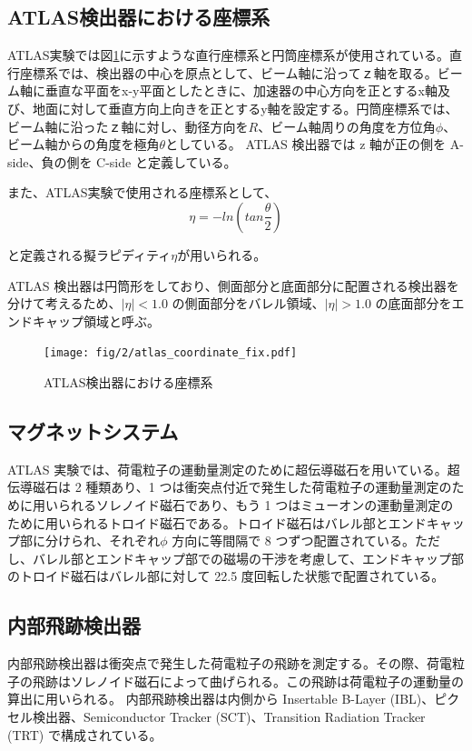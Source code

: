 \subsection{ATLAS検出器における座標系}
ATLAS実験では図\ref{fig:a}に示すような直行座標系と円筒座標系が使用されている。直行座標系では、検出器の中心を原点として、ビーム軸に沿ってｚ軸を取る。ビーム軸に垂直な平面をx-y平面としたときに、加速器の中心方向を正とするx軸及び、地面に対して垂直方向上向きを正とするy軸を設定する。円筒座標系では、ビーム軸に沿ったｚ軸に対し、動径方向を$R$、ビーム軸周りの角度を方位角$\phi$、ビーム軸からの角度を極角$\theta$としている。
ATLAS 検出器では z 軸が正の側を A-side、負の側を C-side と定義している。

また、ATLAS実験で使用される座標系として、
\begin{equation}
　\eta=-ln(tan\frac{\theta}{2})
　\label{ラピディティ}
\end{equation}

と定義される擬ラピディティ$\eta$が用いられる。

ATLAS 検出器は円筒形をしており、側面部分と底面部分に配置される検出器を分けて考えるため、$|\eta| < 1.0$ の側面部分をバレル領域、$|\eta| > 1.0$ の底面部分をエンドキャップ領域と呼ぶ。



\begin{figure}[tb]
  \centering
  \texttt{[image: fig/2/atlas\_coordinate\_fix.pdf]}
  \caption{ATLAS検出器における座標系}
  \label{fig:a}
\end{figure}

\subsection{マグネットシステム}
ATLAS 実験では、荷電粒子の運動量測定のために超伝導磁石を用いている。超伝導磁石は 2 種類あり、1 つは衝突点付近で発生した荷電粒子の運動量測定のために用いられるソレノイド磁石であり、もう 1 つはミューオンの運動量測定のために用いられるトロイド磁石である。トロイド磁石はバレル部とエンドキャップ部に分けられ、それぞれ$\phi$ 方向に等間隔で 8 つずつ配置されている。ただし、バレル部とエンドキャップ部での磁場の干渉を考慮して、エンドキャップ部のトロイド磁石はバレル部に対して 22.5 度回転した状態で配置されている。

\subsection{内部飛跡検出器}
内部飛跡検出器は衝突点で発生した荷電粒子の飛跡を測定する。その際、荷電粒子の飛跡はソレノイド磁石によって曲げられる。この飛跡は荷電粒子の運動量の算出に用いられる。
内部飛跡検出器は内側から Insertable B-Layer (IBL)、ピクセル検出器、Semiconductor Tracker (SCT)、Transition Radiation Tracker (TRT) で構成されている。


